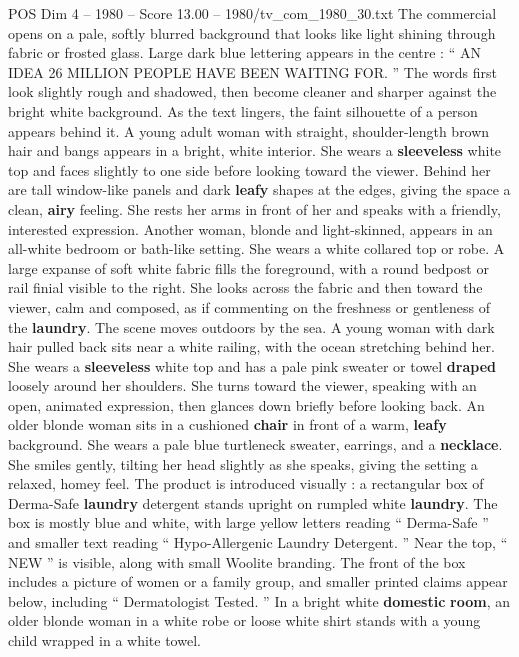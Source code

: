 \begin{textsample}{POS Dim 4 – 1980 – Score 13.00 – 1980/tv\_com\_1980\_30.txt}  \label{ex:f4_pos_049}
The commercial opens on a pale, softly blurred background that looks like light shining through fabric or frosted glass.
Large dark blue lettering appears in the centre : “ AN IDEA 26 MILLION PEOPLE HAVE BEEN WAITING FOR. ” The words first look slightly rough and shadowed, then become cleaner and sharper against the bright white background.
As the text lingers, the faint silhouette of a person appears behind it.
A young adult woman with straight, shoulder-length brown hair and bangs appears in a bright, white interior.
She wears a \textbf{sleeveless} white top and faces slightly to one side before looking toward the viewer.
Behind her are tall window-like panels and dark \textbf{leafy} shapes at the edges, giving the space a clean, \textbf{airy} feeling.
She rests her arms in front of her and speaks with a friendly, interested expression.
Another woman, blonde and light-skinned, appears in an all-white bedroom or bath-like setting.
She wears a white collared top or robe.
A large expanse of soft white fabric fills the foreground, with a round bedpost or rail finial visible to the right.
She looks across the fabric and then toward the viewer, calm and composed, as if commenting on the freshness or gentleness of the \textbf{laundry}.
The scene moves outdoors by the sea.
A young woman with dark hair pulled back sits near a white railing, with the ocean stretching behind her.
She wears a \textbf{sleeveless} white top and has a pale pink sweater or towel \textbf{draped} loosely around her shoulders.
She turns toward the viewer, speaking with an open, animated expression, then glances down briefly before looking back.
An older blonde woman sits in a cushioned \textbf{chair} in front of a warm, \textbf{leafy} background.
She wears a pale blue turtleneck sweater, earrings, and a \textbf{necklace}.
She smiles gently, tilting her head slightly as she speaks, giving the setting a relaxed, homey feel.
The product is introduced visually : a rectangular box of Derma-Safe \textbf{laundry} detergent stands upright on rumpled white \textbf{laundry}.
The box is mostly blue and white, with large yellow letters reading “ Derma-Safe ” and smaller text reading “ Hypo-Allergenic Laundry Detergent. ” Near the top, “ NEW ” is visible, along with small Woolite branding.
The front of the box includes a picture of women or a family group, and smaller printed claims appear below, including “ Dermatologist Tested. ” In a bright white \textbf{domestic} \textbf{room}, an older blonde woman in a white robe or loose white shirt stands with a young child wrapped in a white towel.

\end{textsample}
